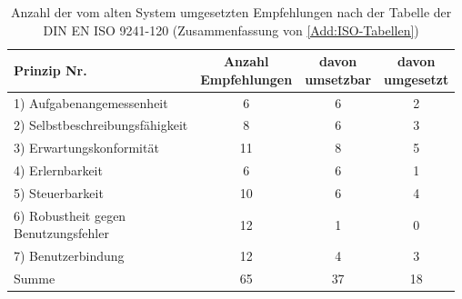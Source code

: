 
\begin{table}[H]
    \centering
    \begin{tabular}{|l|c|c|c|}
        \hline
        Prinzip Nr. & \makecell{Anzahl\\Empfehlungen} & \makecell{davon\\umsetzbar} & \makecell{davon\\umgesetzt} \\ \hline
        1) Aufgabenangemessenheit              & 6  & 6 & 2 \\ \hline
        2) Selbstbeschreibungsfähigkeit        & 8  & 6 & 3 \\ \hline
        3) Erwartungskonformität               & 11 & 8 & 5 \\ \hline
        4) Erlernbarkeit                       & 6  & 6 & 1 \\ \hline
        5) Steuerbarkeit                       & 10 & 6 & 4 \\ \hline
        \makecell[l]{6) Robustheit gegen\\Benutzungsfehler}
                                               & 12 & 1 & 0 \\ \hline
        7) Benutzerbindung                     & 12 & 4 & 3 \\ \hline
        \hline
        Summe                                  & 65 & 37 & 18 \\ \hline
    \end{tabular}
    \caption{Anzahl der vom alten System umgesetzten Empfehlungen nach der Tabelle der DIN EN ISO 9241-120 \cite{DIN_EN_ISO_9241-110} (Zusammenfassung von \autoref{Add:ISO-Tabellen})}
    \label{tab:Zusammenfassung:ISO-Tabellen:alt_Zustand}
\end{table}
